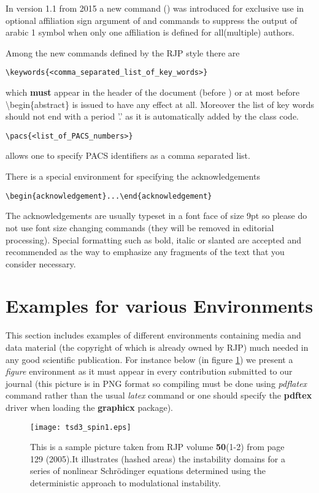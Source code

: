 \documentclass[myclassdoc,debug]{rjparticle}
\begin{document}
In version 1.1 from 2015 a new command () was introduced for exclusive use in optional affiliation sign argument of  and  commands to suppress the output of arabic 1 symbol when only one affiliation is defined for all(multiple) authors.

Among the new commands defined by the RJP style there are 
\begin{lstlisting}
\keywords{<comma_separated_list_of_key_words>}
\end{lstlisting}
which \textbf{must} appear in the header of the document (before ) or at most before \textbackslash begin\{abstract\} is issued to have any effect at all. Moreover the list of key words should not end with a period '.' as it is automatically added by the class code.
\begin{lstlisting}
\pacs{<list_of_PACS_numbers>}
\end{lstlisting}
allows one to specify PACS identifiers as a comma separated list.

There is a special environment for specifying the acknowledgements
\begin{lstlisting}
\begin{acknowledgement}...\end{acknowledgement}
\end{lstlisting}
The acknowledgements are usually typeset in a font face of size 9pt so please do not use font size changing commands (they will be removed in editorial processing). Special formatting such as bold, italic or slanted are accepted and recommended as the way to emphasize any fragments of the text that you consider necessary.

\section{Examples for various Environments}

This section includes examples of different environments containing media and data material (the copyright of which is already owned by RJP) much needed in any good scientific publication. For instance below (in figure \ref{pic1}) we present a \textit{figure} environment as it must appear in every contribution submitted to our journal (this picture is in PNG format so compiling must be done using \textit{pdflatex} command rather than the usual \textit{latex} command or one should specify the \textbf{pdftex} driver when loading the \textbf{graphicx} package).
\begin{figure}[h!tb]
\centering
\texttt{[image: tsd3\_spin1.eps]}
\caption{This is a sample picture taken from RJP volume \textbf{50}(1-2) from page 129 (2005).It illustrates (hashed areas) the instability domains for a series of nonlinear Schr\"odinger equations determined using the deterministic approach to modulational instability.}
\label{pic1}
\end{figure}
\end{document}
